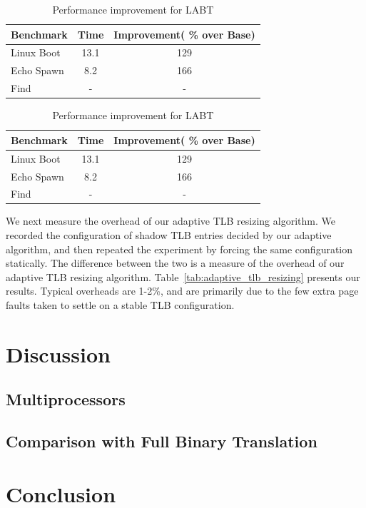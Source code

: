 \documentclass[10pt,twocolumn]{article}
\begin{document}
\begin{table}[!b]
\centering
\caption{Performance improvement for LABT}
     \begin{tabular}{lcc} \hline
       Benchmark  & Time & Improvement( \% over Base)  \\ \hline
       Linux Boot & 13.1 & 129  \\
       Echo Spawn & 8.2 & 166  \\
       Find & - & -  \\
       \hline
     \end{tabular}
\label{tab:ExpWithout1}
\end{table}

\begin{table}[!b]
\centering
\caption{Performance improvement for LABT}
     \begin{tabular}{lcc} \hline
       Benchmark  & Time & Improvement( \% over Base)  \\ \hline
       Linux Boot & 13.1 & 129  \\
       Echo Spawn & 8.2 & 166  \\
       Find & - & -  \\
       \hline
     \end{tabular}
\label{tab:ExpWithout2}
\end{table}

We next measure the overhead of our adaptive TLB resizing algorithm. We recorded
the configuration of shadow TLB entries decided by our adaptive algorithm, and
then repeated the experiment by forcing the same configuration statically. The
difference between the two is a measure of the overhead of our adaptive TLB
resizing algorithm. Table~\ref{tab:adaptive_tlb_resizing} presents our results.
Typical overheads are 1-2\%, and are primarily due to the few extra page faults
taken to settle on a stable TLB configuration.

\section{Discussion}
\subsection{Multiprocessors}
\subsection{Comparison with Full Binary Translation}
\section{Conclusion}



\end{document}
